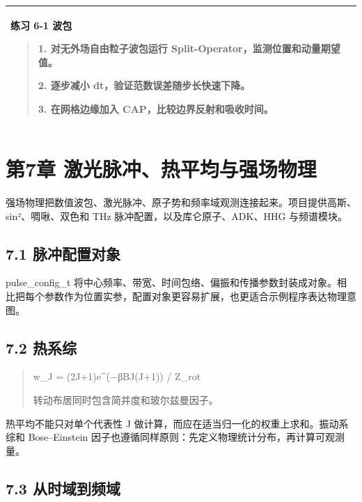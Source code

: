 \documentclass[UTF8,openany,11pt,fontset=fandol]{ctexbook}
\begin{document}
\begin{longtable}[]{@{}l@{}}
\toprule
\endhead
\begin{minipage}[t]{0.97\columnwidth}\raggedright
\textbf{练习 6-1 波包}

\begin{quote}
1. 对无外场自由粒子波包运行 Split-Operator，监测位置和动量期望值。

2. 逐步减小 dt，验证范数误差随步长快速下降。

3. 在网格边缘加入 CAP，比较边界反射和吸收时间。
\end{quote}\strut
\end{minipage}\tabularnewline
\bottomrule
\end{longtable}

\chapter{第7章 激光脉冲、热平均与强场物理}\label{ux7b2c7ux7ae0-ux6fc0ux5149ux8109ux51b2ux70edux5e73ux5747ux4e0eux5f3aux573aux7269ux7406}

强场物理把数值波包、激光脉冲、原子势和频率域观测连接起来。项目提供高斯、sin²、啁啾、双色和
THz 脉冲配置，以及库仑原子、ADK、HHG 与频谱模块。

\section{\texorpdfstring{\textbf{7.1
脉冲配置对象}}{7.1 脉冲配置对象}}\label{ux8109ux51b2ux914dux7f6eux5bf9ux8c61}

pulse\_config\_t
将中心频率、带宽、时间包络、偏振和传播参数封装成对象。相比把每个参数作为位置实参，配置对象更容易扩展，也更适合示例程序表达物理意图。

\section{\texorpdfstring{\textbf{7.2
热系综}}{7.2 热系综}}\label{ux70edux7cfbux7efc}

\begin{quote}
w\_J = (2J+1)e\^{}(−βBJ(J+1)) / Z\_rot

转动布居同时包含简并度和玻尔兹曼因子。
\end{quote}

热平均不能只对单个代表性 J
做计算，而应在适当归一化的权重上求和。振动系综和 Bose--Einstein
因子也遵循同样原则：先定义物理统计分布，再计算可观测量。

\section{\texorpdfstring{\textbf{7.3
从时域到频域}}{7.3 从时域到频域}}\label{ux4eceux65f6ux57dfux5230ux9891ux57df}
\end{document}
